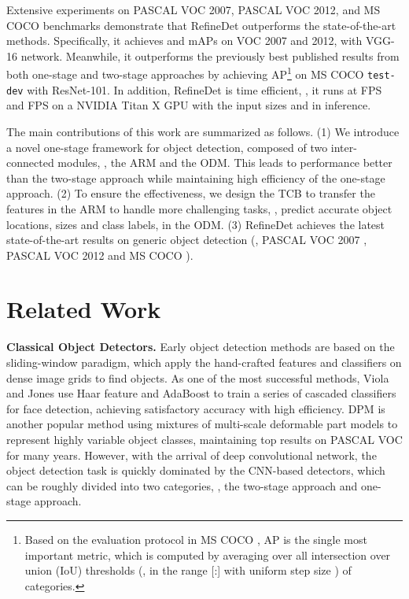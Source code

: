 \documentclass[10pt,twocolumn,letterpaper]{article}
\begin{document}
Extensive experiments on PASCAL VOC 2007, PASCAL VOC 2012, and MS COCO benchmarks demonstrate that RefineDet outperforms the state-of-the-art methods. Specifically, it achieves  and  mAPs on VOC 2007 and 2012, with VGG-16 network. Meanwhile, it outperforms the previously best published results from both one-stage and two-stage approaches by achieving  AP\footnote{Based on the evaluation protocol in MS COCO \cite{DBLP:conf/eccv/LinMBHPRDZ14}, AP is the single most important metric, which is computed by averaging over all  intersection over union (IoU) thresholds (\ie, in the range [:] with uniform step size ) of  categories.} on MS COCO {\tt test-dev} with ResNet-101. In addition, RefineDet is time efficient, \ie, it runs at  FPS and  FPS on a NVIDIA Titan X GPU with the input sizes  and  in inference.

The main contributions of this work are summarized as follows. (1) We introduce a novel one-stage framework for object detection, composed of two inter-connected modules, \ie, the ARM and the ODM. This leads to performance better than the two-stage approach while maintaining high efficiency of the one-stage approach. (2) To ensure the effectiveness, we design the TCB to transfer the features in the ARM to handle more challenging tasks, \ie, predict accurate object locations, sizes and class labels, in the ODM. (3) RefineDet achieves the latest state-of-the-art results on generic object detection (\ie, PASCAL VOC 2007 \cite{pascal-voc-2007}, PASCAL VOC 2012 \cite{pascal-voc-2012} and MS COCO \cite{DBLP:conf/eccv/LinMBHPRDZ14}).


\section{Related Work}

{\noindent \textbf{Classical Object Detectors.}} Early object detection methods are based on the sliding-window paradigm, which apply the hand-crafted features and classifiers on dense image grids to find objects. As one of the most successful methods, Viola and Jones \cite{DBLP:conf/cvpr/ViolaJ01} use Haar feature and AdaBoost to train a series of cascaded classifiers for face detection, achieving satisfactory accuracy with high efficiency. DPM \cite{DBLP:journals/pami/FelzenszwalbGMR10} is another popular method using mixtures of multi-scale deformable part models to represent highly variable object classes, maintaining top results on PASCAL VOC \cite{DBLP:journals/ijcv/EveringhamGWWZ10} for many years. However, with the arrival of deep convolutional network, the object detection task is quickly dominated by the CNN-based detectors, which can be roughly divided into two categories, \ie, the two-stage approach and one-stage approach.
\end{document}
